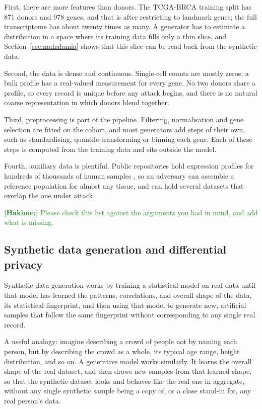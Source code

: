 \documentclass[webpdf,contemporary,large]{oup-authoring-template}
\newif\ifdraft \drafttrue
\newcommand{\annot}[3]{\ifdraft\textcolor{#1}{\textbf{[#2:]} #3}\fi}
\newcommand{\hakime}[1]{\annot{ForestGreen}{Hakime}{#1}}
\begin{document}
First, there are more features than donors. The TCGA-BRCA training split has 871 donors and 978 genes, and that is after restricting to landmark genes; the full transcriptome has about twenty times as many. A generator has to estimate a distribution in a space where its training data fills only a thin slice, and Section~\ref{sec:mahalamia} shows that this slice can be read back from the synthetic data.

Second, the data is dense and continuous. Single-cell counts are mostly zeros; a bulk profile has a real-valued measurement for every gene. No two donors share a profile, so every record is unique before any attack begins, and there is no natural coarse representation in which donors blend together.

Third, preprocessing is part of the pipeline. Filtering, normalisation and gene selection are fitted on the cohort, and most generators add steps of their own, such as standardising, quantile-transforming or binning each gene. Each of these steps is computed from the training data and sits outside the model.

Fourth, auxiliary data is plentiful. Public repositories hold expression profiles for hundreds of thousands of human samples \citep{wilks2021recount3,gtex2020}, so an adversary can assemble a reference population for almost any tissue, and can hold several datasets that overlap the one under attack.

\hakime{Please check this list against the arguments you had in mind, and add what is missing.}

\subsection{Synthetic data generation and differential privacy}
\label{sec:sdg}

Synthetic data generation works by training a statistical model on real data until that model has learned the patterns, correlations, and overall shape of the data, its statistical fingerprint, and then using that model to generate new, artificial samples that follow the same fingerprint without corresponding to any single real record.

A useful analogy: imagine describing a crowd of people not by naming each person, but by describing the crowd as a whole, its typical age range, height distribution, and so on. A generative model works similarly. It learns the overall shape of the real dataset, and then draws new samples from that learned shape, so that the synthetic dataset looks and behaves like the real one in aggregate, without any single synthetic sample being a copy of, or a close stand-in for, any real person's data.
\end{document}
